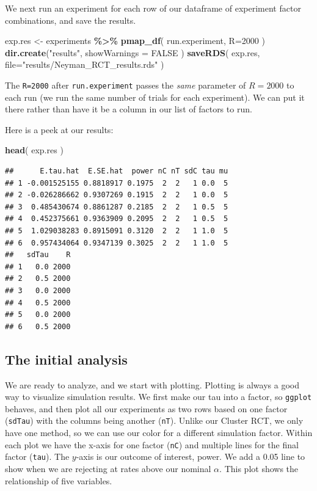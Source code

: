 \documentclass[
]{book}
\newenvironment{Shaded}{\begin{snugshade}}{\end{snugshade}}
\newcommand{\AttributeTok}[1]{\textcolor[rgb]{0.13,0.29,0.53}{#1}}
\newcommand{\ConstantTok}[1]{\textcolor[rgb]{0.56,0.35,0.01}{#1}}
\newcommand{\DecValTok}[1]{\textcolor[rgb]{0.00,0.00,0.81}{#1}}
\newcommand{\FunctionTok}[1]{\textcolor[rgb]{0.13,0.29,0.53}{\textbf{#1}}}
\newcommand{\NormalTok}[1]{#1}
\newcommand{\OtherTok}[1]{\textcolor[rgb]{0.56,0.35,0.01}{#1}}
\newcommand{\SpecialCharTok}[1]{\textcolor[rgb]{0.81,0.36,0.00}{\textbf{#1}}}
\newcommand{\StringTok}[1]{\textcolor[rgb]{0.31,0.60,0.02}{#1}}
\begin{document}
We next run an experiment for each row of our dataframe of experiment factor
combinations, and save the results.

\begin{Shaded}
\begin{Highlighting}[]
\NormalTok{exp.res }\OtherTok{\textless{}{-}}\NormalTok{ experiments }\SpecialCharTok{\%\textgreater{}\%} 
  \FunctionTok{pmap\_df}\NormalTok{( run.experiment, }\AttributeTok{R=}\DecValTok{2000}\NormalTok{ )}
\FunctionTok{dir.create}\NormalTok{(}\StringTok{"results"}\NormalTok{, }\AttributeTok{showWarnings =} \ConstantTok{FALSE}\NormalTok{ )}
\FunctionTok{saveRDS}\NormalTok{( exp.res, }\AttributeTok{file=}\StringTok{"results/Neyman\_RCT\_results.rds"}\NormalTok{ )}
\end{Highlighting}
\end{Shaded}

The \texttt{R=2000} after \texttt{run.experiment} passes the \emph{same} parameter of \(R=2000\) to each
run (we run the same number of trials for each experiment).
We can put it there rather than have it be a column in our list of factors to run.

Here is a peek at our results:

\begin{Shaded}
\begin{Highlighting}[]
\FunctionTok{head}\NormalTok{( exp.res )}
\end{Highlighting}
\end{Shaded}

\begin{verbatim}
##      E.tau.hat  E.SE.hat  power nC nT sdC tau mu
## 1 -0.001525155 0.8818917 0.1975  2  2   1 0.0  5
## 2 -0.026286662 0.9307269 0.1915  2  2   1 0.0  5
## 3  0.485430674 0.8861287 0.2185  2  2   1 0.5  5
## 4  0.452375661 0.9363909 0.2095  2  2   1 0.5  5
## 5  1.029038283 0.8915091 0.3120  2  2   1 1.0  5
## 6  0.957434064 0.9347139 0.3025  2  2   1 1.0  5
##   sdTau    R
## 1   0.0 2000
## 2   0.5 2000
## 3   0.0 2000
## 4   0.5 2000
## 5   0.0 2000
## 6   0.5 2000
\end{verbatim}

\subsection{The initial analysis}\label{the-initial-analysis}

We are ready to analyze, and we start with plotting.
Plotting is always a good way to visualize simulation results.
We first make our tau into a factor, so \texttt{ggplot} behaves, and then plot all our
experiments as two rows based on one factor (\texttt{sdTau}) with the columns being
another (\texttt{nT}).
Unlike our Cluster RCT, we only have one method, so we can use our color for a different simulation factor.
Within each plot we have the x-axis for one factor (\texttt{nC}) and multiple lines for the final factor (\texttt{tau}).
The \(y\)-axis is our outcome of interest, power. We add a 0.05 line to show
when we are rejecting at rates above our nominal \(\alpha\). This plot shows
the relationship of five variables.
\end{document}
